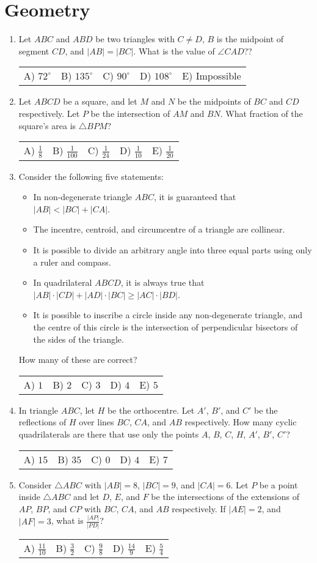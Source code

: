\documentclass{article}
\newcommand{\answers}[5]{
  \begin{center}
    \begin{tabular}{*{5}{p{0.15\textwidth}}}
      A) #1 & B) #2 & C) #3 & D) #4 & E) #5
    \end{tabular}
  \end{center}
}
\begin{document}
\section{Geometry}
\begin{enumerate}

\item %
Let $ABC$ and $ABD$ be two triangles with $C \ne D$, $B$ is the midpoint of segment $CD$, and $|AB| = |BC|$.
What is the value of $\angle CAD$??
\answers{$72^\circ$}{$135^\circ$}{$90^\circ$}{$108^\circ$}{Impossible}

\item %
Let $ABCD$ be a square, and let $M$ and $N$ be the midpoints of $BC$ and $CD$ respectively.
Let $P$ be the intersection of $AM$ and $BN$.
What fraction of the square's area is $\triangle BPM$?
\answers{ $\frac{1}{8}$ }{ $\frac{1}{100}$ }{ $\frac{1}{24}$ }{ $\frac{1}{10}$ }{ $\frac{1}{20}$ }

\item %
Consider the following five statements:
\begin{itemize}
  \item In non-degenerate triangle $ABC$, it is guaranteed that $|AB| < |BC| + |CA|$.
  \item The incentre, centroid, and circumcentre of a triangle are collinear.
  \item It is possible to divide an arbitrary angle into three equal parts using only a ruler and compass.
  \item In quadrilateral $ABCD$, it is always true that $|AB| \cdot |CD| + |AD| \cdot |BC| \ge |AC| \cdot |BD|$.
  \item It is possible to inscribe a circle inside any non-degenerate triangle, and the centre of this circle is the intersection of perpendicular bisectors of the sides of the triangle.
\end{itemize}
How many of these are correct?
\answers{$1$}{$2$}{$3$}{$4$}{$5$}

\item %
In triangle $ABC$, let $H$ be the orthocentre.
Let $A'$, $B'$, and $C'$ be the reflections of $H$ over lines $BC$, $CA$, and $AB$ respectively.
How many cyclic quadrilaterals are there that use only the points $A$, $B$, $C$, $H$, $A'$, $B'$, $C'$?
\answers{$15$}{$35$}{$0$}{$4$}{$7$}

\item %
Consider $\triangle ABC$ with $|AB| = 8$, $|BC| = 9$, and $|CA| = 6$.
Let $P$ be a point inside $\triangle ABC$ and let $D$, $E$, and $F$ be the intersections of the extensions of $AP$, $BP$, and $CP$ with $BC$, $CA$, and $AB$ respectively.
If $|AE| = 2$, and $|AF| = 3$, what is $\frac{|AP|}{|PD|}$?
\answers{ $\frac{11}{10}$ }{ $\frac{3}{2}$ }{ $\frac{9}{8}$ }{ $\frac{14}{9}$ }{ $\frac{5}{4}$ }

\end{enumerate}
\end{document}
